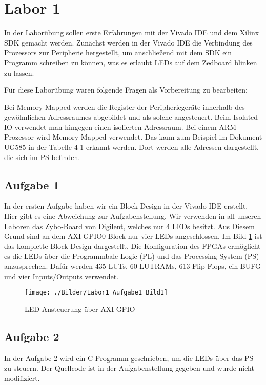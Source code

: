 \section{Labor 1}
In \cite[S. 12]{Mazzetti1996} der Laborübung sollen erste Erfahrungen mit der Vivado IDE und dem Xilinx SDK gemacht werden. Zunächst werden in der Vivado IDE die Verbindung des Prozessors zur Peripherie hergestellt, um anschließend mit dem SDK ein Programm schreiben zu können, was es erlaubt LEDs auf dem Zedboard blinken zu lassen.

Für diese Laborübung waren folgende Fragen als Vorbereitung zu bearbeiten:

    {Bei Memory Mapped werden die Register der Peripheriegeräte innerhalb des gewöhnlichen Adressraumes abgebildet und als solche angesteuert. Beim Isolated IO verwendet man hingegen einen isolierten Adressraum. Bei einem ARM Prozessor wird Memory Mapped verwendet. Das kann zum Beispiel im Dokument UG585 in der Tabelle 4-1 erkannt werden. Dort werden alle Adressen dargestellt, die sich im PS befinden.}

\subsection{Aufgabe 1}

In der ersten Aufgabe haben wir ein Block Design in der Vivado IDE erstellt. Hier gibt es eine Abweichung zur Aufgabenstellung. Wir verwenden in all unseren Laboren das Zybo-Board von Digilent, welches nur 4 LEDs besitzt. Aus Diesem Grund sind an dem AXI-GPIO0-Block nur vier LEDs angeschlossen. Im Bild \ref{Labor1_Aufgabe1_Bild1} ist das komplette Block Design dargestellt. Die Konfiguration des FPGAs ermöglicht es die LEDs über die Programmbale Logic (PL) und das Processing System (PS) anzusprechen. Dafür werden 435 LUTs, 60 LUTRAMs, 613 Flip Flops, ein BUFG und vier Inputs/Outputs verwendet.

\begin{figure}[hbt]
	\centering
	\texttt{[image: ./Bilder/Labor1\_Aufgabe1\_Bild1]}
	\caption{LED Ansteuerung über AXI GPIO}
	\label{Labor1_Aufgabe1_Bild1}
\end{figure}

\subsection{Aufgabe 2}
In der Aufgabe 2 wird ein C-Programm geschrieben, um die LEDs über das PS zu steuern. Der Quellcode ist in der Aufgabenstellung gegeben und wurde nicht modifiziert.

